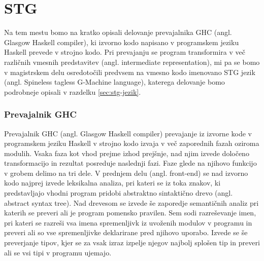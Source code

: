 \chapter{STG}
\label{ch:stg}

Na tem mestu bomo na kratko opisali delovanje prevajalnika GHC (angl. Glasgow Haskell compiler), ki izvorno kodo napisano v programskem jeziku Haskell prevede v strojno kodo. Pri prevajanju se program transformira v več različnih vmesnih predstavitev (angl. intermediate representation), mi pa se bomo v magistrskem delu osredotočili predvsem na vmesno kodo imenovano STG jezik (angl. Spineless tagless G-Machine language), katerega delovanje bomo podrobneje opisali v razdelku \ref{sec:stg-jezik}.

\subsection{Prevajalnik GHC}
\label{sec:prevajalnik-ghc}


Prevajalnik GHC (angl. Glasgow Haskell compiler) prevajanje iz izvorne kode v programskem jeziku Haskell v strojno kodo izvaja v več zaporednih fazah oziroma modulih. Vsaka faza kot vhod prejme izhod prejšnje, nad njim izvede določeno transformacijo in rezultat posreduje naslednji fazi. Faze glede na njihovo funkcijo v grobem delimo na tri dele. V prednjem delu (angl. front-end) se nad izvorno kodo najprej izvede leksikalna analiza, pri kateri se iz toka znakov, ki predstavljajo vhodni program pridobi abstraktno sintaktično drevo (angl. abstract syntax tree). Nad drevesom se izvede še zaporedje semantičnih analiz pri katerih se preveri ali je program pomensko pravilen. Sem sodi razreševanje imen, pri kateri se razreši vsa imena spremenljivk iz uvoženih modulov v programu in preveri ali so vse spremenljivke deklarirane pred njihovo uporabo. Izvede se še preverjanje tipov, kjer se za vsak izraz izpelje njegov najbolj splošen tip in preveri ali se vsi tipi v programu ujemajo.

